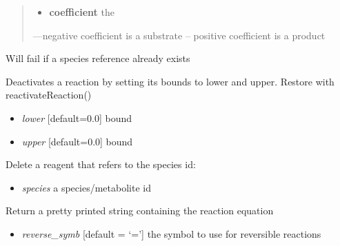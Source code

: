 \documentclass[a4paper,11pt,english]{sphinxmanual}
\begin{document}
\begin{fulllineitems}
\begin{fulllineitems}
\begin{quote}
\begin{itemize}
\item {} 
\textbf{coefficient} the

\end{itemize}

\begin{flushright}
---negative coefficient is a substrate
-- positive coefficient is a product
\end{flushright}
\end{quote}

Will fail if a species reference already exists

\end{fulllineitems}


\begin{fulllineitems}
\label{modules_doc:cbmpy.CBModel.Reaction.deactivateReaction}
Deactivates a reaction by setting its bounds to lower and upper. Restore with reactivateReaction()
\begin{itemize}
\item {} 
\emph{lower} {[}default=0.0{]} bound

\item {} 
\emph{upper} {[}default=0.0{]} bound

\end{itemize}

\end{fulllineitems}


\begin{fulllineitems}
\label{modules_doc:cbmpy.CBModel.Reaction.deleteReagentWithSpeciesRef}
Delete a reagent that refers to the species id:
\begin{itemize}
\item {} 
\emph{species} a species/metabolite id

\end{itemize}

\end{fulllineitems}


\begin{fulllineitems}
\label{modules_doc:cbmpy.CBModel.Reaction.getEquation}
Return a pretty printed string containing the reaction equation
\begin{itemize}
\item {} 
\emph{reverse\_symb} {[}default = `='{]} the symbol to use for reversible reactions


\end{itemize}
\end{fulllineitems}
\end{fulllineitems}
\end{document}
